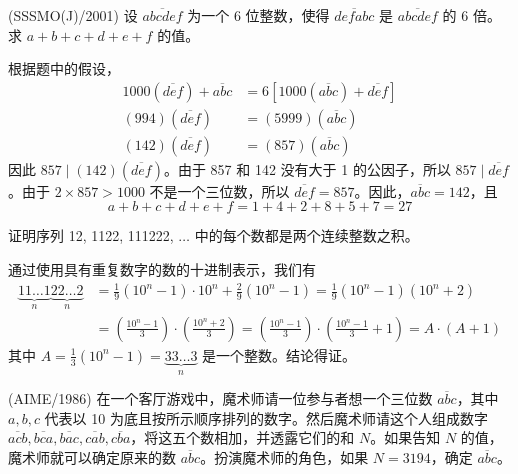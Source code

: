 \begin{questions}
\question (SSSMO(J)/2001) 设 $\overline{abcdef}$ 为一个 6 位整数，使得 $\overline{defabc}$ 是 $\overline{abcdef}$ 的 6 倍。求 $a + b + c + d + e + f$ 的值。

\begin{solution}
根据题中的假设，
\begin{align*}
1000(\overline{def}) + \overline{abc} &= 6[1000(\overline{abc}) + \overline{def}] \\
(994)(\overline{def}) &= (5999)(\overline{abc}) \\
(142)(\overline{def}) &= (857)(\overline{abc})
\end{align*}
因此 $857 \mid (142)(\overline{def})$。由于 857 和 142 没有大于 1 的公因子，所以 $857 \mid \overline{def}$。由于 $2 \times 857 > 1000$ 不是一个三位数，所以 $\overline{def} = 857$。因此，$\overline{abc} = 142$，且
\[
a + b + c + d + e + f = 1 + 4 + 2 + 8 + 5 + 7 = 27
\]
\end{solution}

\question 证明序列 12, 1122, 111222, $\dots$ 中的每个数都是两个连续整数之积。

\begin{solution}
通过使用具有重复数字的数的十进制表示，我们有
\begin{align*}
\underbrace{11 \dots 1}_{n} \underbrace{22 \dots 2}_{n} &= \frac{1}{9}(10^n - 1) \cdot 10^n + \frac{2}{9}(10^n - 1) = \frac{1}{9}(10^n - 1)(10^n + 2) \\
&= \left( \frac{10^n - 1}{3} \right) \cdot \left( \frac{10^n + 2}{3} \right) = \left( \frac{10^n - 1}{3} \right) \cdot \left( \frac{10^n - 1}{3} + 1 \right) = A \cdot (A + 1)
\end{align*}
其中 $A = \frac{1}{3}(10^n - 1) = \underbrace{33 \dots 3}_{n}$ 是一个整数。结论得证。
\end{solution}

\question (AIME/1986) 在一个客厅游戏中，魔术师请一位参与者想一个三位数 $\overline{abc}$，其中 $a, b, c$ 代表以 10 为底且按所示顺序排列的数字。然后魔术师请这个人组成数字 $\overline{acb}, \overline{bca}, \overline{bac}, \overline{cab}, \overline{cba}$，将这五个数相加，并透露它们的和 $N$。如果告知 $N$ 的值，魔术师就可以确定原来的数 $\overline{abc}$。扮演魔术师的角色，如果 $N = 3194$，确定 $\overline{abc}$。


\end{questions}

